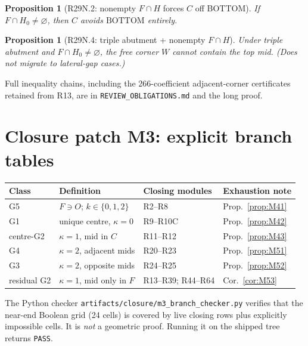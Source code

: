 \documentclass[11pt,reqno]{amsart}
\newtheorem{proposition}[theorem]{Proposition}
\theoremstyle{definition}
\newcommand{\BOTTOM}{\mathrm{BOTTOM}}
\begin{document}
\begin{proposition}[R29N.2: nonempty $F\cap H$ forces $C$ off BOTTOM]\label{prop:R29N2}
If $F\cap H_0\neq\varnothing$, then $C$ avoids $\BOTTOM$ entirely.
\end{proposition}

\begin{proposition}[R29N.4: triple abutment + nonempty $F\cap H$]\label{prop:R29N4}
Under triple abutment and $F\cap H_0\neq\varnothing$, the free corner $W$ cannot
contain the top mid.  (Does not migrate to lateral-gap cases.)
\end{proposition}

Full inequality chains, including the 266-coefficient adjacent-corner
certificates retained from R13, are in
\texttt{REVIEW\_OBLIGATIONS.md} and the long proof.

\section{Closure patch M3: explicit branch tables}\label{app:M3}

\begin{center}
\small
\begin{tabular}{@{}p{}p{}p{}p{}@{}}
\toprule
Class & Definition & Closing modules & Exhaustion note \\
\midrule
G5 & $F\ni O$; $k\in\{0,1,2\}$ & R2--R8 & Prop.~\ref{prop:M41} \\
G1 & unique centre, $\kappa=0$ & R9--R10C & Prop.~\ref{prop:M42} \\
centre-G2 & $\kappa=1$, mid in $C$ & R11--R12 & Prop.~\ref{prop:M43} \\
G4 & $\kappa=2$, adjacent mids & R20--R23 & Prop.~\ref{prop:M51} \\
G3 & $\kappa=2$, opposite mids & R24--R25 & Prop.~\ref{prop:M52} \\
residual G2 & $\kappa=1$, mid only in $F$ & R13--R39; R44--R64 & Cor.~\ref{cor:M53} \\
\bottomrule
\end{tabular}
\end{center}

\noindent
The Python checker \texttt{artifacts/closure/m3\_branch\_checker.py} verifies
that the near-end Boolean grid (24 cells) is covered by live closing rows
plus explicitly impossible cells.  It is \emph{not} a geometric proof.
Running it on the shipped tree returns \texttt{PASS}.
\end{document}
